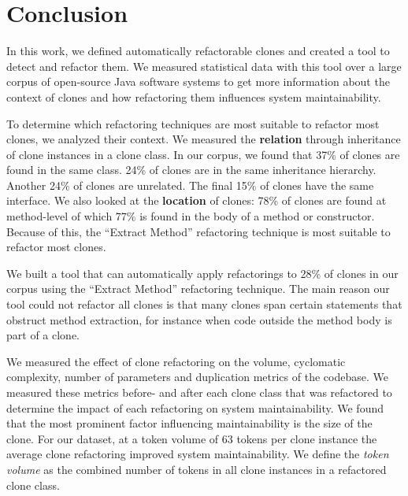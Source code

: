 \chapter{Conclusion} \label{ch:conclusion}
In this work, we defined automatically refactorable clones and created a tool to detect and refactor them. We measured statistical data with this tool over a large corpus of open-source Java software systems to get more information about the context of clones and how refactoring them influences system maintainability.


To determine which refactoring techniques are most suitable to refactor most clones, we analyzed their context. We measured the \textbf{relation} through inheritance of clone instances in a clone class. In our corpus, we found that 37\% of clones are found in the same class. 24\% of clones are in the same inheritance hierarchy. Another 24\% of clones are unrelated. The final 15\% of clones have the same interface. We also looked at the \textbf{location} of clones: 78\% of clones are found at method-level of which 77\% is found in the body of a method or constructor. Because of this, the ``Extract Method'' refactoring technique is most suitable to refactor most clones.

We built a tool that can automatically apply refactorings to 28\% of clones in our corpus using the ``Extract Method'' refactoring technique. The main reason our tool could not refactor all clones is that many clones span certain statements that obstruct method extraction, for instance when code outside the method body is part of a clone.

We measured the effect of clone refactoring on the volume, cyclomatic complexity, number of parameters and duplication metrics of the codebase. We measured these metrics before- and after each clone class that was refactored to determine the impact of each refactoring on system maintainability. We found that the most prominent factor influencing maintainability is the size of the clone. For our dataset, at a token volume of 63 tokens per clone instance the average clone refactoring improved system maintainability. We define the \textit{token volume} as the combined number of tokens in all clone instances in a refactored clone class.

